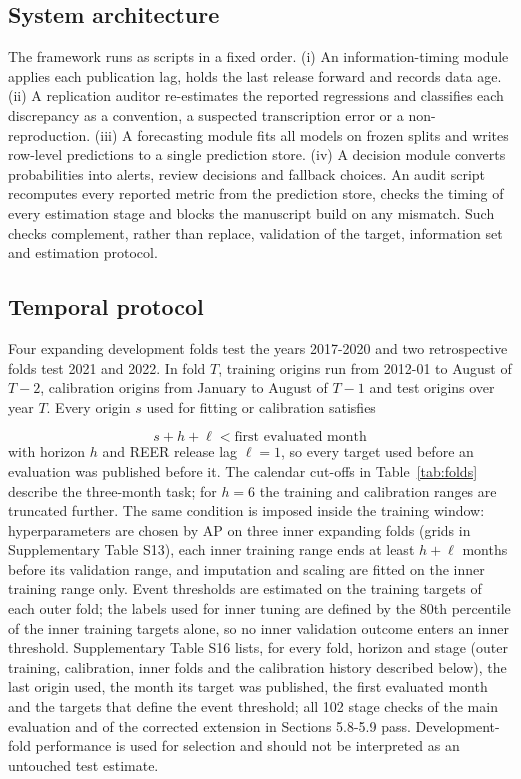 \documentclass[preprint,12pt,authoryear]{elsarticle}
\begin{document}
\subsection{System architecture}
The framework runs as scripts in a fixed order. (i) An information-timing module applies each publication lag, holds the last release forward and records data age. (ii) A replication auditor re-estimates the reported regressions and classifies each discrepancy as a convention, a suspected transcription error or a non-reproduction. (iii) A forecasting module fits all models on frozen splits and writes row-level predictions to a single prediction store. (iv) A decision module converts probabilities into alerts, review decisions and fallback choices. An audit script recomputes every reported metric from the prediction store, checks the timing of every estimation stage and blocks the manuscript build on any mismatch. Such checks complement, rather than replace, validation of the target, information set and estimation protocol.

\subsection{Temporal protocol}
Four expanding development folds test the years 2017-2020 and two retrospective folds test 2021 and 2022. In fold $T$, training origins run from 2012-01 to August of $T-2$, calibration origins from January to August of $T-1$ and test origins over year $T$. Every origin $s$ used for fitting or calibration satisfies

\begin{equation}\label{eq:mat}
s + h + \ell < \text{first evaluated month}
\end{equation}
with horizon $h$ and REER release lag $\ell = 1$, so every target used before an evaluation was published before it. The calendar cut-offs in Table~\ref{tab:folds} describe the three-month task; for $h = 6$ the training and calibration ranges are truncated further. The same condition is imposed inside the training window: hyperparameters are chosen by AP on three inner expanding folds (grids in Supplementary Table S13), each inner training range ends at least $h + \ell$ months before its validation range, and imputation and scaling are fitted on the inner training range only. Event thresholds are estimated on the training targets of each outer fold; the labels used for inner tuning are defined by the 80th percentile of the inner training targets alone, so no inner validation outcome enters an inner threshold. Supplementary Table S16 lists, for every fold, horizon and stage (outer training, calibration, inner folds and the calibration history described below), the last origin used, the month its target was published, the first evaluated month and the targets that define the event threshold; all 102 stage checks of the main evaluation and of the corrected extension in Sections 5.8-5.9 pass. Development-fold performance is used for selection and should not be interpreted as an untouched test estimate.
\end{document}
